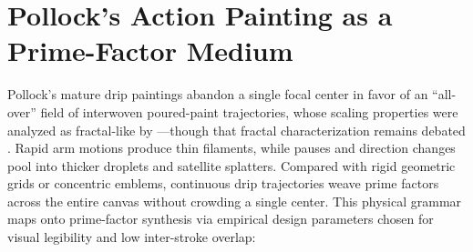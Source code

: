 \documentclass[]{interact}
\theoremstyle{plain}
\theoremstyle{definition}
\theoremstyle{remark}
\begin{document}
\section{Pollock's Action Painting as a Prime-Factor Medium}
Pollock's mature drip paintings abandon a single focal center in favor of an ``all-over'' field of interwoven poured-paint trajectories, whose scaling properties were analyzed as fractal-like by \citet{taylor1999fractal}—though that fractal characterization remains debated \citep{jonessmith2006fractal}. Rapid arm motions produce thin filaments, while pauses and direction changes pool into thicker droplets and satellite splatters. Compared with rigid geometric grids or concentric emblems, continuous drip trajectories weave prime factors across the entire canvas without crowding a single center. This physical grammar maps onto prime-factor synthesis via empirical design parameters chosen for visual legibility and low inter-stroke overlap:
\end{document}
